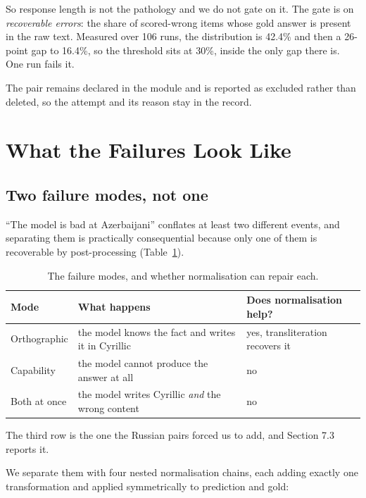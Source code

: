 \documentclass[final]{clv2025}
\begin{document}
So response length is not the pathology and we do not gate on it. The gate is
on \emph{recoverable errors}: the share of scored-wrong items whose gold answer
is present in the raw text. Measured over 106 runs, the distribution is 42.4\%
and then a 26-point gap to 16.4\%, so the threshold sits at 30\%, inside the
only gap there is. One run fails it.

The pair remains declared in the module and is reported as excluded rather than
deleted, so the attempt and its reason stay in the record.

\section{What the Failures Look Like}

\subsection{Two failure modes, not one}

``The model is bad at Azerbaijani'' conflates at least two different events,
and separating them is practically consequential because only one of them is
recoverable by post-processing (Table~\ref{tab:modes}).

\begin{table}[h!]
\caption{The failure modes, and whether normalisation can repair each.}
\label{tab:modes}
\centering
\begin{tabular}{lp{}p{}}
\toprule
Mode & What happens & Does normalisation help? \\
\midrule
Orthographic & the model knows the fact and writes it in Cyrillic & yes, transliteration recovers it \\
Capability & the model cannot produce the answer at all & no \\
Both at once & the model writes Cyrillic \emph{and} the wrong content & no \\
\bottomrule
\end{tabular}
\end{table}

The third row is the one the Russian pairs forced us to add, and Section 7.3
reports it.

We separate them with four nested normalisation chains, each adding exactly one
transformation and applied symmetrically to prediction and gold:
\end{document}
